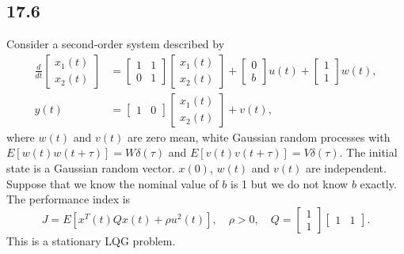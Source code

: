 \documentclass{article}
\newcommand{\problem}[2]{\subsection*{#1}}
\begin{document}
\problem{17.6}{}
Consider a second-order system described by
\[
\begin{aligned}
\frac{d}{dt}\begin{bmatrix} x_1(t) \\ x_2(t) \end{bmatrix} &=
\begin{bmatrix} 1 & 1 \\ 0 & 1 \end{bmatrix}
\begin{bmatrix} x_1(t) \\ x_2(t) \end{bmatrix} +
\begin{bmatrix} 0 \\ b \end{bmatrix} u(t) +
\begin{bmatrix} 1 \\ 1 \end{bmatrix} w(t), \\
y(t) &= \begin{bmatrix} 1 & 0 \end{bmatrix} \begin{bmatrix} x_1(t) \\ x_2(t) \end{bmatrix} + v(t),
\end{aligned}
\]
where $w(t)$ and $v(t)$ are zero mean, white Gaussian random processes with $E[w(t)w(t + \tau)] = W\delta(\tau)$ and $E[v(t)v(t + \tau)] = V\delta(\tau)$. The initial state is a Gaussian random vector. $x(0)$, $w(t)$ and $v(t)$ are independent. Suppose that we know the nominal value of $b$ is 1 but we do not know $b$ exactly. The performance index is
\[
J = E\left[x^T(t)Qx(t) + \rho u^2(t)\right], \quad \rho > 0, \quad
Q = \begin{bmatrix} 1 \\ 1 \end{bmatrix}\begin{bmatrix} 1 & 1 \end{bmatrix}.
\]
This is a stationary LQG problem.
\end{document}
